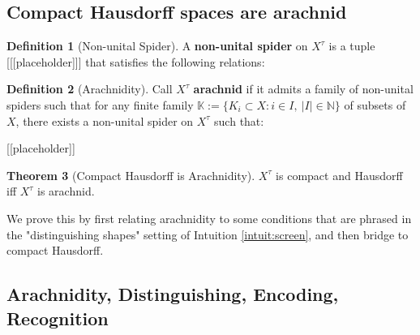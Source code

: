 \documentclass{tufte-handout}
\theoremstyle{definition}
\newtheorem{theorem}{Theorem}[section]
\newtheorem{defn}[theorem]{Definition}
\newtheorem{rem}[theorem]{Reminder}
\begin{document}
\subsection{ Compact Hausdorff spaces are arachnid }


\begin{defn}[Non-unital Spider]
A \textbf{non-unital spider} on $X^\tau$ is a tuple [[[placeholder]]] that satisfies the following relations:

\end{defn}

\begin{defn}[Arachnidity]
Call $X^\tau$ \textbf{arachnid} if it admits a family of non-unital spiders such that for any finite family $\mathbb{K}:=\{K_i \subset X : i \in I, \ |I| \in \mathbb{N}\}$ of subsets of $X$, there exists a non-unital spider on $X^\tau$ such that:

[[placeholder]]

\end{defn}

\begin{theorem}[Compact Hausdorff is Arachnidity]
$X^\tau$ is compact and Hausdorff iff $X^\tau$ is arachnid.
\end{theorem}

We prove this by first relating arachnidity to some conditions that are phrased in the "distinguishing shapes" setting of Intuition \ref{intuit:screen}, and then bridge to compact Hausdorff.

\subsection{Arachnidity, Distinguishing, Encoding, Recognition}
\end{document}
